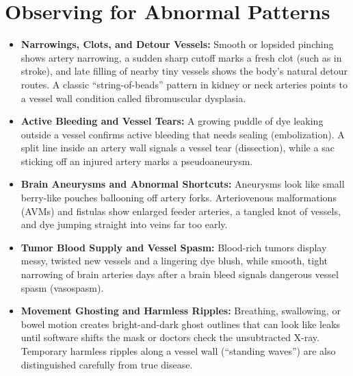 \section{Observing for Abnormal Patterns}
\begin{itemize}
\item \textbf{Narrowings, Clots, and Detour Vessels:} Smooth or lopsided pinching shows artery narrowing, a sudden sharp cutoff marks a fresh clot (such as in stroke), and late filling of nearby tiny vessels shows the body's natural detour routes. A classic ``string-of-beads'' pattern in kidney or neck arteries points to a vessel wall condition called fibromuscular dysplasia.
\item \textbf{Active Bleeding and Vessel Tears:} A growing puddle of dye leaking outside a vessel confirms active bleeding that needs sealing (embolization). A split line inside an artery wall signals a vessel tear (dissection), while a sac sticking off an injured artery marks a pseudoaneurysm.
\item \textbf{Brain Aneurysms and Abnormal Shortcuts:} Aneurysms look like small berry-like pouches ballooning off artery forks. Arteriovenous malformations (AVMs) and fistulas show enlarged feeder arteries, a tangled knot of vessels, and dye jumping straight into veins far too early.
\item \textbf{Tumor Blood Supply and Vessel Spasm:} Blood-rich tumors display messy, twisted new vessels and a lingering dye blush, while smooth, tight narrowing of brain arteries days after a brain bleed signals dangerous vessel spasm (vasospasm).
\item \textbf{Movement Ghosting and Harmless Ripples:} Breathing, swallowing, or bowel motion creates bright-and-dark ghost outlines that can look like leaks until software shifts the mask or doctors check the unsubtracted X-ray. Temporary harmless ripples along a vessel wall (``standing waves'') are also distinguished carefully from true disease.
\end{itemize}

